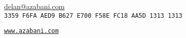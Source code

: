 \documentclass[a4paper,12pt]{article}
\begin{document}
\hrulefill

\hspace{5mm}\begin{minipage}{110mm}
	                    \href{mailto:delan@azabani.com}{\Huge{delan\textcolor{lg}{@}azabani\textcolor{lg}{.com}}}
	\vspace{0.5em}  \\  {\texttt{\textcolor{lg}{3359 F6FA AED9 B627 E700 F58E FC18 AA5D 1313 1313}}}
\end{minipage}\hfill\begin{minipage}{50mm}
	\hfill
	\texttt{\href{https://www.azabani.com/about/}{www.azabani.com}}
\end{minipage}\hspace{5mm}

\hrulefill

\vspace{1em}
\end{document}
